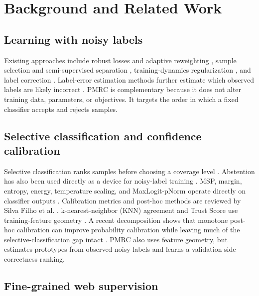 \documentclass[review,times]{elsarticle}
\newcommand{\method}{PMRC}
\begin{document}
\section{Background and Related Work}

\subsection{Learning with noisy labels}

Existing approaches include robust losses and adaptive reweighting \citep{wang2019sce,ren2018reweight}, sample selection and semi-supervised separation \citep{han2018coteaching,li2020dividemix}, training-dynamics regularization \citep{ma2018dimensionality,yu2019disagreement}, and label correction \citep{liu2020elr}. Label-error estimation methods further estimate which observed labels are likely incorrect \citep{northcutt2021confident}. \method{} is complementary because it does not alter training data, parameters, or objectives. It targets the order in which a fixed classifier accepts and rejects samples.

\subsection{Selective classification and confidence calibration}

Selective classification ranks samples before choosing a coverage level \citep{geifman2017selective,geifman2019selectivenet,gangrade2021onesided}. Abstention has also been used directly as a device for noisy-label training \citep{thulasidasan2019abstention}. MSP, margin, entropy, energy, temperature scaling, and MaxLogit-pNorm operate directly on classifier outputs \citep{hendrycks2017msp,guo2017calibration,cattelan2024fix}. Calibration metrics and post-hoc methods are reviewed by Silva Filho et al. \citep{silvafilho2023calibration}. k-nearest-neighbor (KNN) agreement and Trust Score use training-feature geometry \citep{jiang2018trust}. A recent decomposition shows that monotone post-hoc calibration can improve probability calibration while leaving much of the selective-classification gap intact \citep{rabanser2025selectivegap}. \method{} also uses feature geometry, but estimates prototypes from observed noisy labels and learns a validation-side correctness ranking.

\subsection{Fine-grained web supervision}
\end{document}

